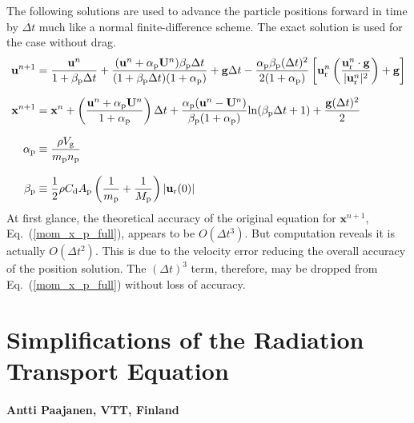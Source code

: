 The following solutions are used to advance the particle positions forward in time by $\Delta t$ much like a normal finite-difference scheme. The exact solution is used for the case without drag.
\begin{align}
    \mathbf{u}^{n+1} &= \frac{\mathbf{u}^n}{1 + \beta_{\rm p} \Delta t} + \frac{(\mathbf{u}^n + \alpha_{\rm p} \mathbf{U}^n)\beta_{\rm p} \Delta t}{(1 + \beta_{\rm p} \Delta t)(1 + \alpha_{\rm p})} + \mathbf{g} \Delta t - \frac{\alpha_{\rm p} \beta_{\rm p} (\Delta t)^2}{2 (1 + \alpha_{\rm p})} \left[\mathbf{u}_\text{r}^n \left(\frac{\mathbf{u}_\text{r}^n \cdot \mathbf{g}}{|\mathbf{u}_\text{r}^n|^2}\right) + \mathbf{g}\right] \\[.1in]
    \mathbf{x}^{n+1} &= \mathbf{x}^n + \left(\frac{\mathbf{u}^n + \alpha_{\rm p} \mathbf{U}^n}{1 + \alpha_{\rm p}}\right) \Delta t + \frac{\alpha_{\rm p} (\mathbf{u}^n - \mathbf{U}^n)}{\beta_{\rm p} (1 + \alpha_{\rm p})} \text{ln}(\beta_{\rm p} \Delta t + 1) + \frac{\mathbf{g} (\Delta t)^2}{2} \\[.1in]
    \alpha_{\rm p} &\equiv \frac{\rho V_{\rm g}}{m_{\rm p} n_{\rm p}} \\[.1in]
    \beta_{\rm p} &\equiv \frac{1}{2} \rho C_\text{d} A_\text{p} \left(\frac{1}{m_{\rm p}} + \frac{1}{M_{\rm p}} \right) |\mathbf{u}_{\text{r}}(0)|
\end{align}
At first glance, the theoretical accuracy of the original equation for $\mathbf{x}^{n+1}$, Eq.~(\ref{mom_x_p_full}), appears to be $\mathit{O}(\Delta t^3)$. But computation reveals it is actually $\mathit{O}(\Delta t^2)$. This is due to the velocity error reducing the overall accuracy of the position solution. The $(\Delta t)^3$ term, therefore, may be dropped from Eq.~(\ref{mom_x_p_full}) without loss of accuracy.






\chapter{Simplifications of the Radiation Transport Equation}
\label{radiation_derivations}

\subsubsection*{Antti Paajanen, VTT, Finland}


